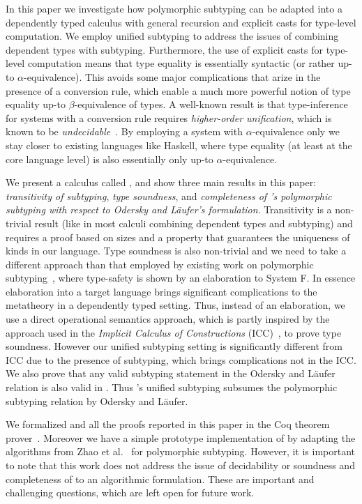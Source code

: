 In this paper we investigate how polymorphic subtyping can be
adapted into a dependently typed calculus with general recursion and
explicit casts for type-level computation. We employ unified subtyping
to address the issues of combining dependent types with subtyping.
Furthermore, the use of explicit casts
for type-level computation means that type equality is essentially
syntactic (or rather up-to $\alpha$-equivalence).
This avoids some major complications that arize in the presence
of a conversion rule, which enable a much more powerful notion of type equality
up-to $\beta$-equivalence of types. 
A well-known result is that type-inference for systems
with a conversion rule requires \emph{higher-order
  unification}, which is known to be \emph{undecidable}~\cite{goldfarb1981undecidability}.
By employing a system with $\alpha$-equivalence only we stay closer to existing
languages like Haskell, where type equality (at least at the core language level)
is also essentially only up-to $\alpha$-equivalence.

We present a calculus called \name, and show three main results in this paper:
\emph{transitivity of subtyping}, \emph{type soundness}, and \emph{completeness
of \name's polymorphic subtyping with respect to Odersky and L\"aufer's formulation}.
Transitivity is a non-trivial result (like in most calculi combining dependent types
and subtyping) and requires a proof based on sizes and a property that guarantees
the uniqueness of kinds in our language. Type soundness is also non-trivial and we need
to take a different approach than that employed by existing work on polymorphic
subtyping~\cite{odersky1996putting, jones2007practical}, where type-safety is shown by an
elaboration to System F. In essence elaboration into a target language
brings significant complications to the metatheory in a dependently typed setting.
Thus, instead of an elaboration, we use a direct operational semantics approach, which
is partly inspired by the approach used in the \emph{Implicit Calculus of Constructions} (ICC)~\cite{miquel2001implicit,barras2008implicit},
to prove type soundness. However our unified subtyping setting is significantly
different from ICC due to the presence of subtyping, which brings complications not in the ICC.
We also prove that any valid subtyping statement in the Odersky and L\"aufer relation
is also valid in \name. Thus \name's unified subtyping subsumes the polymorphic subtyping
relation by Odersky and L\"aufer.

We formalized \name and all the proofs reported in this paper in the Coq theorem
prover~\cite{coq}. Moreover we have a simple prototype implementation of \name by adapting
the algorithms from Zhao et al.~\cite{zhao19mechanical} for polymorphic subtyping.
However, it is important to note that this work
does not address the issue of decidability or soundness and completeness of \name to an
algorithmic formulation. These are important and challenging
questions, which are left open for future work. 

